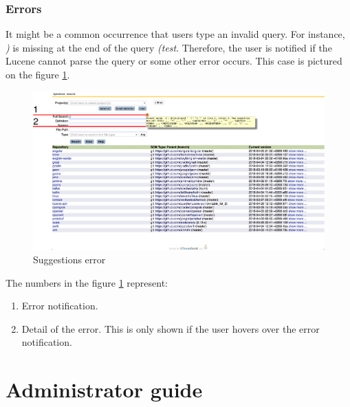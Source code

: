\subsubsection{Errors}
It might be a common occurrence that users type an invalid query. For instance, \textit{)} is missing at the end of
the query \textit{(test}. Therefore, the user is notified if the Lucene cannot parse the query or some other
error occurs. This case is pictured on the figure \ref{suggestions_error}.

\begin{figure}[htbp]
    \centering
    \includegraphics[width=145mm]{../img/suggestions_error.png}
    \caption{Suggestions error}
    \label{suggestions_error}
\end{figure}

The numbers in the figure \ref{suggestions_error} represent:
\begin{enumerate}
    \item Error notification.
    \item Detail of the error. This is only shown if the user hovers over the error notification.
\end{enumerate}

\section{Administrator guide}
\label{administrator_guide}

